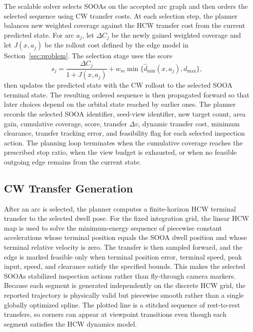 The scalable solver selects SOOAs on the accepted arc graph and then orders the
selected sequence using CW transfer costs. At each selection step, the planner
balances new weighted coverage against the HCW transfer cost from the current
predicted state. For arc $a_j$, let $\Delta C_j$ be the newly gained
weighted coverage and let $J(x,a_j)$ be the rollout cost defined by the edge
model in Section~\ref{sec:problem}. The selection stage uses the score
\begin{equation}
  s_j =
  \frac{\Delta C_j}{1+J(x,a_j)}
  + w_m \min\{\widehat{d}_{\min}(x,a_j),d_{\max}\},
\end{equation}
then updates the predicted state with the CW rollout to the selected SOOA
terminal state.
The resulting ordered sequence is then propagated forward so that later choices
depend on the orbital state reached by earlier ones. The planner records the
selected SOOA identifier, seed-view identifier, new target count, area gain, cumulative
coverage, score, transfer $\Delta v$, dynamic transfer cost, minimum
clearance, transfer tracking error, and feasibility flag for each selected
inspection action.
The planning loop terminates when the cumulative coverage reaches the
prescribed stop ratio, when the view budget is exhausted, or when no feasible
outgoing edge remains from the current state.

\subsection{CW Transfer Generation}

After an arc is selected, the planner computes a finite-horizon HCW terminal
transfer to the selected dwell pose. For the fixed integration grid,
the linear HCW map is used to solve the minimum-energy sequence of piecewise
constant accelerations whose terminal position equals the SOOA dwell position
and whose terminal relative velocity is zero. The transfer is then
sampled forward, and the edge is marked feasible only when terminal position
error, terminal speed, peak input, speed, and clearance satisfy the specified
bounds. This makes the selected SOOAs stabilized inspection actions rather than
fly-through camera markers.
Because each segment is generated independently on the discrete HCW grid, the
reported trajectory is physically valid but piecewise smooth rather than a
single globally optimized spline. The plotted line is a stitched sequence of
rest-to-rest transfers, so corners can appear at viewpoint transitions even
though each segment satisfies the HCW dynamics model.

